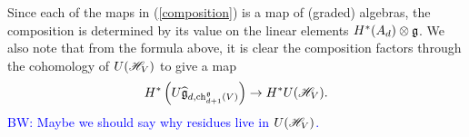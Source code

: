 \documentclass[11pt]{amsart}
\def\brian{\textcolor{blue}{BW: }\textcolor{blue}}
\begin{document}
Since each of the maps in (\ref{composition}) is a map of (graded) algebras, the composition is determined by its value on the linear elements $H^*(A_d) \otimes \mathfrak g$. 
We also note that from the formula above, it is clear the composition factors through the cohomology of $U(\mathscr H_{V})$ to give a map
\[
H^*\left(U \widehat{\mathfrak g}_{d, {\rm ch}_{d+1}^\mathfrak g(V)}\right) \to H^* U(\mathscr H_V) .
\]
\brian{Maybe we should say why residues live in $U(\mathscr H_V)$.}
\end{document}
